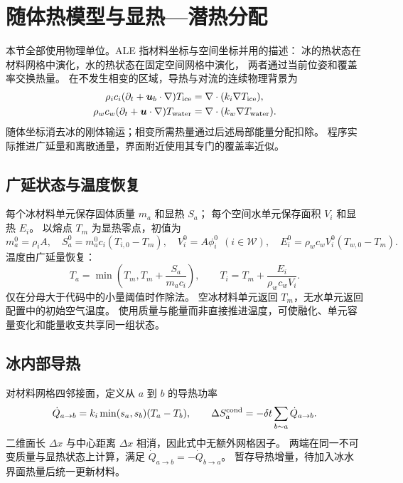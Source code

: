 \section{随体热模型与显热—潜热分配}
\label{sec:thermal}
本节全部使用物理单位。ALE 指材料坐标与空间坐标并用的描述：
冰的热状态在材料网格中演化，水的热状态在固定空间网格中演化，
两者通过当前位姿和覆盖率交换热量。
在不发生相变的区域，导热与对流的连续物理背景为
\begin{align}
 \rho_ic_i(\partial_t+\bm u_b\cdot\nabla)T_{\rm ice}&=\nabla\cdot(k_i\nabla T_{\rm ice}),\\
 \rho_wc_w(\partial_t+\bm u\cdot\nabla)T_{\rm water}&=\nabla\cdot(k_w\nabla T_{\rm water}).
\end{align}
随体坐标消去冰的刚体输运；相变所需热量通过后述局部能量分配扣除。
程序实际推进广延量和离散通量，界面附近使用其专门的覆盖率近似。

\subsection{广延状态与温度恢复}
每个冰材料单元保存固体质量 $m_a$ 和显热 $S_a$；
每个空间水单元保存面积 $V_i$ 和显热 $E_i$。
以熔点 $T_m$ 为显热零点，初值为
\begin{equation}
 m_a^0=\rho_iA,\quad S_a^0=m_a^0c_i(T_{i,0}-T_m),\quad
 V_i^0=A\phi_i^0\ \ (i\in\mathcal W),\quad
 E_i^0=\rho_wc_wV_i^0(T_{w,0}-T_m).
\end{equation}
温度由广延量恢复：
\begin{equation}
 T_a=\min\left(T_m,T_m+\frac{S_a}{m_ac_i}\right),\qquad
 T_i=T_m+\frac{E_i}{\rho_wc_wV_i}.
 \label{eq:temperature}
\end{equation}
仅在分母大于代码中的小量阈值时作除法。
空冰材料单元返回 $T_m$，无水单元返回配置中的初始空气温度。
使用质量与能量而非直接推进温度，可使融化、单元容量变化和能量收支共享同一组状态。

\subsection{冰内部导热}
对材料网格四邻接面，定义从 $a$ 到 $b$ 的导热功率
\begin{equation}
 \dot Q_{a\to b}=k_i\min(s_a,s_b)(T_a-T_b),\qquad
 \Delta S_a^{\rm cond}=-\delta t\sum_{b\sim a}\dot Q_{a\to b}.
\end{equation}
二维面长 $\Delta x$ 与中心距离 $\Delta x$ 相消，因此式中无额外网格因子。
两端在同一不可变质量与显热状态上计算，满足
$\dot Q_{a\to b}=-\dot Q_{b\to a}$。
 暂存导热增量，待加入冰水界面热量后统一更新材料。

